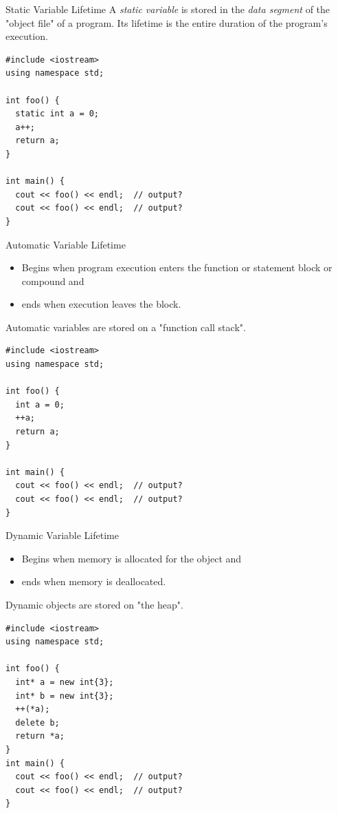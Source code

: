 \documentclass[presentation]{beamer}
\begin{document}
\begin{frame}[fragile,label={sec:orgheadline37}]{Static Variable Lifetime}
 A \emph{static variable} is stored in the \emph{data segment} of the "object
file" of a program.  Its lifetime is the entire duration of the
program's execution.

\begin{verbatim}
#include <iostream>
using namespace std;

int foo() {
  static int a = 0;
  a++;
  return a;
}

int main() {
  cout << foo() << endl;  // output?
  cout << foo() << endl;  // output?
}
\end{verbatim}
\end{frame}

\begin{frame}[fragile,label={sec:orgheadline38}]{Automatic Variable Lifetime}
 \begin{itemize}
\item Begins when program execution enters the function or statement block or compound and
\item ends when execution leaves the block.
\end{itemize}


Automatic variables are stored on a "function call stack".

\begin{verbatim}
#include <iostream>
using namespace std;

int foo() {
  int a = 0;
  ++a;
  return a;
}

int main() {
  cout << foo() << endl;  // output?
  cout << foo() << endl;  // output?
}
\end{verbatim}
\end{frame}

\begin{frame}[fragile,label={sec:orgheadline39}]{Dynamic Variable Lifetime}
 \begin{itemize}
\item Begins when memory is allocated for the object and
\item ends when memory is deallocated.
\end{itemize}


Dynamic objects are stored on "the heap".

\begin{verbatim}
#include <iostream>
using namespace std;

int foo() {
  int* a = new int{3};
  int* b = new int{3};
  ++(*a);
  delete b;
  return *a;
}
int main() {
  cout << foo() << endl;  // output?
  cout << foo() << endl;  // output?
}
\end{verbatim}
\end{frame}
\end{document}
